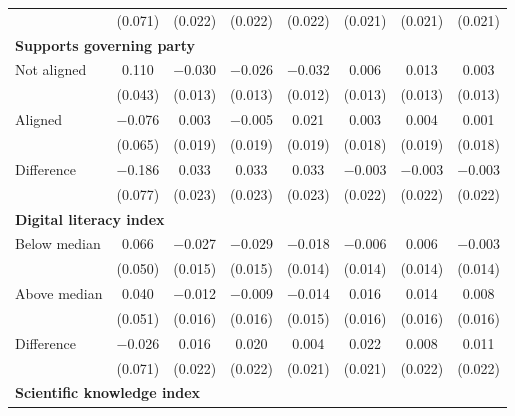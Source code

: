 \begin{tabular}[t]{lccccccc}
 & (\num{0.071}) & (\num{0.022}) & (\num{0.022}) & (\num{0.022}) & (\num{0.021}) & (\num{0.021}) & (\num{0.021})\\\multicolumn{4}{l}{\textbf{Supports governing party}} \rule{0pt}{1.2\normalbaselineskip}\\
\hspace{1em} Not aligned & \num{0.110} & \num{-0.030} & \num{-0.026} & \num{-0.032} & \num{0.006} & \num{0.013} & \num{0.003}\\
 & (\num{0.043}) & (\num{0.013}) & (\num{0.013}) & (\num{0.012}) & (\num{0.013}) & (\num{0.013}) & (\num{0.013})\\
\hspace{1em} Aligned & \num{-0.076} & \num{0.003} & \num{-0.005} & \num{0.021} & \num{0.003} & \num{0.004} & \num{0.001}\\
 & (\num{0.065}) & (\num{0.019}) & (\num{0.019}) & (\num{0.019}) & (\num{0.018}) & (\num{0.019}) & (\num{0.018})\\\cmidrule(lr){2-8}
\hspace{1em} Difference & \num{-0.186} & \num{0.033} & \num{0.033} & \num{0.033} & \num{-0.003} & \num{-0.003} & \num{-0.003}\\
 & (\num{0.077}) & (\num{0.023}) & (\num{0.023}) & (\num{0.023}) & (\num{0.022}) & (\num{0.022}) & (\num{0.022})\\\multicolumn{4}{l}{\textbf{Digital literacy index}} \rule{0pt}{1.2\normalbaselineskip}\\
\hspace{1em} Below median & \num{0.066} & \num{-0.027} & \num{-0.029} & \num{-0.018} & \num{-0.006} & \num{0.006} & \num{-0.003}\\
 & (\num{0.050}) & (\num{0.015}) & (\num{0.015}) & (\num{0.014}) & (\num{0.014}) & (\num{0.014}) & (\num{0.014})\\
\hspace{1em} Above median & \num{0.040} & \num{-0.012} & \num{-0.009} & \num{-0.014} & \num{0.016} & \num{0.014} & \num{0.008}\\
 & (\num{0.051}) & (\num{0.016}) & (\num{0.016}) & (\num{0.015}) & (\num{0.016}) & (\num{0.016}) & (\num{0.016})\\\cmidrule(lr){2-8}
\hspace{1em}  Difference & \num{-0.026} & \num{0.016} & \num{0.020} & \num{0.004} & \num{0.022} & \num{0.008} & \num{0.011}\\
 & (\num{0.071}) & (\num{0.022}) & (\num{0.022}) & (\num{0.021}) & (\num{0.021}) & (\num{0.022}) & (\num{0.022})\\\multicolumn{4}{l}{\textbf{Scientific knowledge index}} \rule{0pt}{1.2\normalbaselineskip}\\

\end{tabular}
